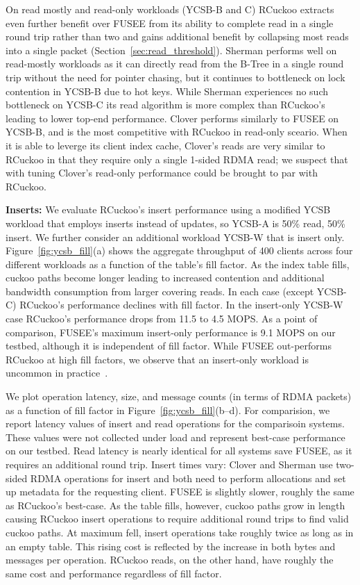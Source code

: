 On read mostly and read-only workloads (YCSB-B and C)
RCuckoo extracts even further benefit over FUSEE from its ability to
complete read in a single round trip rather than two and gains
additional benefit by collapsing most reads into a single packet
(Section~\ref{sec:read_threshold}).  Sherman performs well on
read-mostly workloads as it can directly read from the B-Tree in a
single round trip without the need for pointer chasing, but it
continues to bottleneck on lock contention in YCSB-B due to hot
keys. While Sherman experiences no such bottleneck on YCSB-C its read
algorithm is more complex than RCuckoo's leading to lower top-end
performance. Clover performs similarly to FUSEE on YCSB-B, and is the
most competitive with RCuckoo in read-only sceario.  When it is able
to leverge its client index cache, Clover's reads are very similar to
RCuckoo in that they require only a single 1-sided RDMA read;  we
suspect that with tuning Clover's read-only performance
could be brought to par with RCuckoo.

\textbf{Inserts:}
We evaluate RCuckoo's insert performance using a modified YCSB
workload that employs inserts instead of updates, so YCSB-A is 50\%
read, 50\% insert. We further consider an additional workload
YCSB-W that is insert only.  Figure~\ref{fig:ycsb_fill}(a)
shows the aggregate throughput of 400 clients across four different
workloads as a function of the table's fill factor.  As the index
table fills, cuckoo paths become longer leading to increased
contention and additional bandwidth consumption from larger covering
reads. In each case (except YCSB-C) RCuckoo's performance declines with
fill factor. In the insert-only YCSB-W case RCuckoo's
performance drops from 11.5 to 4.5 MOPS.  As a point of comparison,
FUSEE's maximum insert-only performance is 9.1 MOPS on our testbed,
although it is independent of fill factor.  While FUSEE out-performs
RCuckoo at high fill factors, we observe that an insert-only workload is
uncommon in practice~\cite{facebook-memcached}.

We plot operation latency, size, and message counts (in terms of RDMA
packets) as a function of fill factor in
Figure~\ref{fig:ycsb_fill}(b--d).  For comparision, we report latency
values of insert and read operations for the comparisoin
systems. These values were not collected under load and represent
best-case performance on our testbed.  Read latency is nearly
identical for all systems save FUSEE, as it requires an additional
round trip.  Insert times vary: Clover and Sherman use two-sided RDMA
operations for insert and both need to perform allocations and set up
metadata for the requesting client.  FUSEE is slightly slower, roughly
the same as RCuckoo's best-case.  As the table fills, however, cuckoo
paths grow in length causing RCuckoo insert operations to require
additional round trips to find valid cuckoo paths.  At maximum fell,
insert operations take roughly twice as long as in an empty
table. This rising cost is reflected by the increase in both bytes
and messages per operation.  RCuckoo reads, on the other hand, have
roughly the same cost and performance regardless of fill factor.


